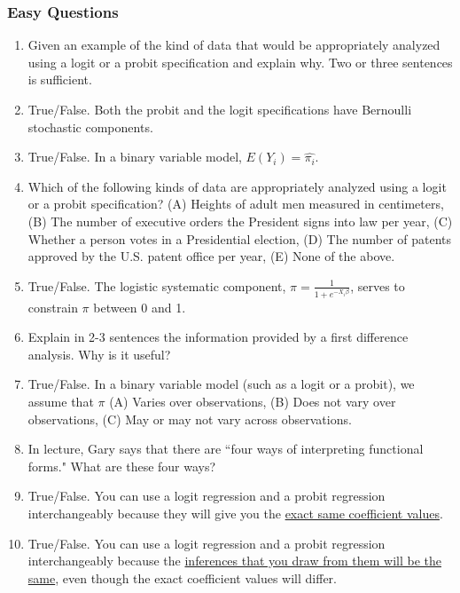 \documentclass[11pt]{article}
\begin{document}
\subsubsection{Easy Questions}

\begin{enumerate}
\item Given an example of the kind of data that would be appropriately analyzed using a logit or a probit specification and explain why.  Two or three sentences is sufficient. 
\item True/False.  Both the probit and the logit specifications have Bernoulli stochastic components. 
\item True/False. In a binary variable model, $E(Y_i)=\hat{\pi_i}$. 
\item Which of the following kinds of data are appropriately analyzed using a logit or a probit specification? (A) Heights of adult men measured in centimeters, (B) The number of executive orders the President signs into law per year, (C) Whether a person votes in a Presidential election, (D) The number of patents approved by the U.S. patent office per year, (E) None of the above. 
\item True/False.  The logistic systematic component, $\pi = \frac{1}{1+e^{-X_i\beta}}$, serves to constrain $\pi$ between 0 and 1. 
\item Explain in 2-3 sentences the information provided by a first difference analysis.  Why is it useful? 
\item True/False.  In a binary variable model (such as a logit or a probit), we assume that $\pi$ (A) Varies over observations, (B) Does not vary over observations, (C) May or may not vary across observations. 
\item In lecture, Gary says that there are ``four ways of interpreting functional forms."  What are these four ways? 
\item True/False. You can use a logit regression and a probit regression interchangeably because they will give you the \underline{exact same coefficient values}. 
\item True/False. You can use a logit regression and a probit regression interchangeably because the \underline{inferences that you draw from them will be the same}, even though the exact coefficient values will differ. 

\end{enumerate}
\end{document}
